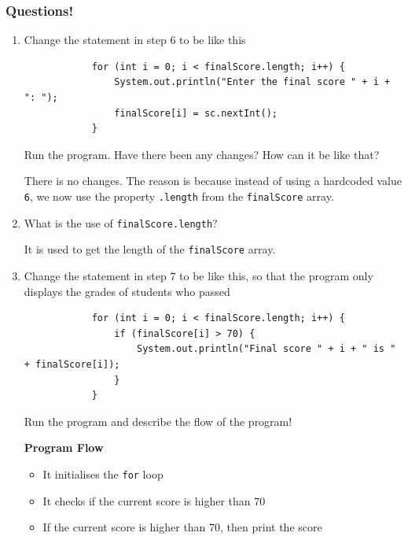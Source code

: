 \documentclass[12pt,titlepage]{article}
\begin{document}
\subsubsection*{Questions!}
\begin{enumerate}
    \item {
        Change the statement in step 6 to be like this

        \begin{verbatim}
            for (int i = 0; i < finalScore.length; i++) {
                System.out.println("Enter the final score " + i + ": ");
                finalScore[i] = sc.nextInt();
            }
        \end{verbatim}

        Run the program. Have there been any changes? How can it be like that?

        There is no changes. The reason is because instead of using a hardcoded value \texttt{6}, we now use the property \texttt{.length} from the \texttt{finalScore} array.
    }
    \item {
        What is the use of \texttt{finalScore.length}?

        It is used to get the length of the \texttt{finalScore} array.
    }
    \item {
        Change the statement in step 7 to be like this, so that the program only displays the grades of students who passed

        \begin{verbatim}
            for (int i = 0; i < finalScore.length; i++) {
                if (finalScore[i] > 70) {
                    System.out.println("Final score " + i + " is " + finalScore[i]);
                }
            }
        \end{verbatim}

        Run the program and describe the flow of the program!

        \textbf{Program Flow}
        \begin{itemize}
            \item It initialises the \texttt{for} loop
            \item It checks if the current score is higher than 70
            \item If the current score is higher than 70, then print the score
        \end{itemize}

}
\end{enumerate}
\end{document}

